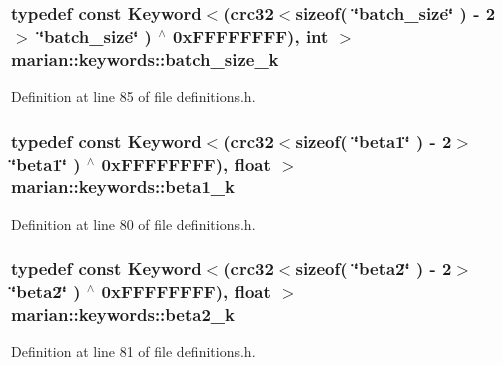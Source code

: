 \subsubsection[{\texorpdfstring{batch\+\_\+size\+\_\+k}{batch_size_k}}]{\setlength{\rightskip}{0pt plus 5cm}typedef const {\bf Keyword}$<$({\bf crc32}$<$sizeof( \char`\"{}batch\+\_\+size\char`\"{} ) -\/ 2$>$ \char`\"{}{\bf batch\+\_\+size}\char`\"{} ) $^\wedge$ 0x\+F\+F\+F\+F\+F\+F\+F\+F), int $>$ marian\+::keywords\+::batch\+\_\+size\+\_\+k}\hypertarget{namespacemarian_1_1keywords_acc29b3bc2c61d954c306fca0cf7113e5}{}\label{namespacemarian_1_1keywords_acc29b3bc2c61d954c306fca0cf7113e5}


Definition at line 85 of file definitions.\+h.

\subsubsection[{\texorpdfstring{beta1\+\_\+k}{beta1_k}}]{\setlength{\rightskip}{0pt plus 5cm}typedef const {\bf Keyword}$<$({\bf crc32}$<$sizeof( \char`\"{}beta1\char`\"{} ) -\/ 2$>$ \char`\"{}{\bf beta1}\char`\"{} ) $^\wedge$ 0x\+F\+F\+F\+F\+F\+F\+F\+F), float $>$ marian\+::keywords\+::beta1\+\_\+k}\hypertarget{namespacemarian_1_1keywords_a1305f7d1623cc0bdc776760b61ead5c0}{}\label{namespacemarian_1_1keywords_a1305f7d1623cc0bdc776760b61ead5c0}


Definition at line 80 of file definitions.\+h.

\subsubsection[{\texorpdfstring{beta2\+\_\+k}{beta2_k}}]{\setlength{\rightskip}{0pt plus 5cm}typedef const {\bf Keyword}$<$({\bf crc32}$<$sizeof( \char`\"{}beta2\char`\"{} ) -\/ 2$>$ \char`\"{}{\bf beta2}\char`\"{} ) $^\wedge$ 0x\+F\+F\+F\+F\+F\+F\+F\+F), float $>$ marian\+::keywords\+::beta2\+\_\+k}\hypertarget{namespacemarian_1_1keywords_a8c433988725a968d8f443937345116ff}{}\label{namespacemarian_1_1keywords_a8c433988725a968d8f443937345116ff}


Definition at line 81 of file definitions.\+h.

